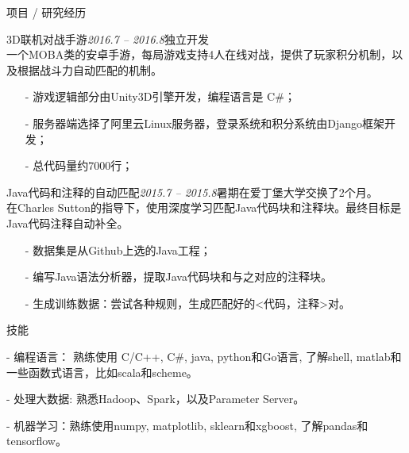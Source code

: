 \documentclass{resume} %
\begin{document}
\begin{rSection}{项目 / 研究经历}
\begin{rSubsection}{3D联机对战手游}{\em 2016.7 – 2016.8}{独立开发 \\}
{一个MOBA类的安卓手游，每局游戏支持4人在线对战，提供了玩家积分机制，以及根据战斗力自动匹配的机制。}
\item[]
\begin{itemize}
\setlength\itemsep{-0.5em}
\item[-] 游戏逻辑部分由Unity3D引擎开发，编程语言是 C\#；
\item[-] 服务器端选择了阿里云Linux服务器，登录系统和积分系统由Django框架开发；
\item[-] 总代码量约7000行；
\end{itemize}
\end{rSubsection}

\begin{rSubsection}{Java代码和注释的自动匹配}{\em 2015.7 – 2015.8}{暑期在爱丁堡大学交换了2个月。 \\}
{在Charles Sutton的指导下，使用深度学习匹配Java代码块和注释块。最终目标是Java代码注释自动补全。}
\item[]
\begin{itemize}
\setlength\itemsep{-0.5em}
\item[-] 数据集是从Github上选的Java工程；
\item[-] 编写Java语法分析器，提取Java代码块和与之对应的注释块。
\item[-] 生成训练数据：尝试各种规则，生成匹配好的<代码，注释>对。
\end{itemize}
\end{rSubsection}

\end{rSection}


\begin{rSection}{技能}
\begin{rSubsection}
{}{}{}{}
\item[-] 编程语言： 熟练使用 C/C++, C\#, java, python和Go语言, 了解shell, matlab和一些函数式语言，比如scala和scheme。
\item[-] 处理大数据: 熟悉Hadoop、Spark，以及Parameter Server。
\item[-] 机器学习：熟练使用numpy, matplotlib, sklearn和xgboost, 了解pandas和tensorflow。
\end{rSubsection}
\end{rSection}
\end{document}
